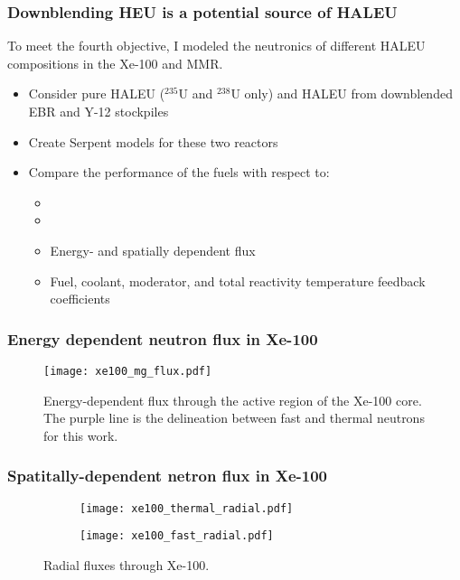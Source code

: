 \begin{frame}
    \frametitle{Downblending HEU is a potential source of HALEU}
    To meet the fourth objective, I modeled the neutronics of 
    different HALEU compositions in the Xe-100 and MMR.
    \begin{itemize}
        \item Consider pure HALEU ($^{235}$U and $^{238}$U only)
              and HALEU from downblended \gls{EBR} 
              \cite{vaden_isotopic_2018} and Y-12 
              \cite{nelson_foreign_2010} stockpiles
        \item Create Serpent \cite{leppanen_serpent_2013} models 
              for these two reactors
        \item Compare the performance of the fuels with respect to:
        \begin{itemize}
            \item \keff
            \item \betaEff
            \item Energy- and spatially dependent flux
            \item Fuel, coolant, moderator, and total reactivity
                  temperature feedback coefficients
        \end{itemize}
    \end{itemize}

\end{frame}

\begin{frame}
    \frametitle{Energy dependent neutron flux in Xe-100}
    \begin{figure}
        \centering 
        \texttt{[image: xe100\_mg\_flux.pdf]}
        \caption{Energy-dependent flux through the active region 
        of the Xe-100 core. The purple line is the delineation 
        between fast and thermal neutrons for this work.}
    \end{figure}
\end{frame}

\begin{frame}
    \frametitle{Spatitally-dependent netron flux in Xe-100}
    \begin{figure}
        \centering 
        \begin{subfigure}{0.49\textwidth}
            \texttt{[image: xe100\_thermal\_radial.pdf]}
        \end{subfigure}
        \begin{subfigure}{0.49\textwidth}
            \texttt{[image: xe100\_fast\_radial.pdf]}
        \end{subfigure}
        \caption{Radial fluxes through Xe-100.}
        \label{fig:xe100-flux}
    \end{figure}
\end{frame}